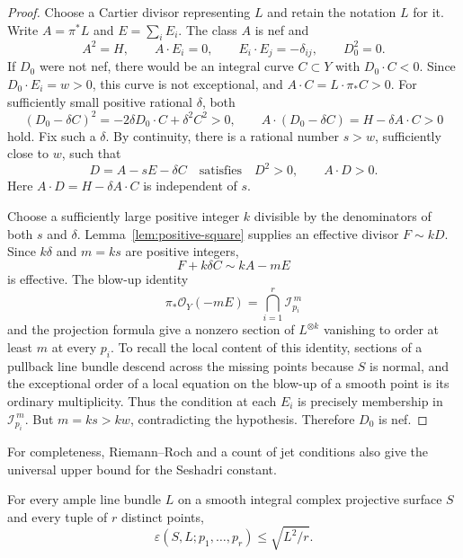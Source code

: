 \begin{proof}
Choose a Cartier divisor representing $L$ and retain the notation $L$
for it. Write $A=\pi^*L$ and $E=\sum_iE_i$. The class $A$ is nef and
\[
 A^2=H,\qquad A\cdot E_i=0,\qquad
 E_i\cdot E_j=-\delta_{ij},\qquad D_0^2=0.
\]
If $D_0$ were not nef, there would be an integral curve $C\subset Y$
with $D_0\cdot C<0$. Since $D_0\cdot E_i=w>0$, this curve is not
exceptional, and $A\cdot C=L\cdot\pi_*C>0$.
For sufficiently small positive rational $\delta$, both
\[
 (D_0-\delta C)^2=-2\delta D_0\cdot C+\delta^2C^2>0,
 \qquad
 A\cdot(D_0-\delta C)=H-\delta A\cdot C>0
\]
hold. Fix such a $\delta$. By continuity, there is a rational number
$s>w$, sufficiently close to $w$, such that
\[
 D=A-sE-\delta C
 \quad\text{satisfies}\quad D^2>0,\qquad A\cdot D>0.
\]
Here $A\cdot D=H-\delta A\cdot C$ is independent of $s$.

Choose a sufficiently large positive integer $k$ divisible by the
denominators of both $s$ and $\delta$.
Lemma~\ref{lem:positive-square} supplies an effective divisor
$F\sim kD$. Since $k\delta$ and $m=ks$ are positive integers,
\[
 F+k\delta C\sim kA-mE
\]
is effective. The blow-up identity \cite[Tag 0AGP, Lemma 54.3.4(4)]{Stacks}
\[
 \pi_*\mathcal O_Y(-mE)
   =\bigcap_{i=1}^r\mathcal I_{p_i}^{\,m}
\]
and the projection formula give a nonzero section of
$L^{\otimes k}$ vanishing to order at least $m$ at every $p_i$.
To recall the local content of this identity, sections of a pullback
line bundle descend across the missing points because $S$ is normal,
and the exceptional order of a local equation on the blow-up of a
smooth point is its ordinary multiplicity. Thus the condition at each
$E_i$ is precisely membership in $\mathcal I_{p_i}^{\,m}$.
But $m=ks>kw$, contradicting the hypothesis. Therefore $D_0$ is nef.
\end{proof}

For completeness, Riemann--Roch and a count of jet conditions also give
the universal upper bound for the Seshadri constant.

\begin{lemma}\label{lem:sesha-upper}
For every ample line bundle $L$ on a smooth integral complex projective
surface $S$ and every tuple of $r$ distinct points,
\[
 \varepsilon(S,L;p_1,\ldots,p_r)\le\sqrt{L^2/r}.
\]
\end{lemma}

